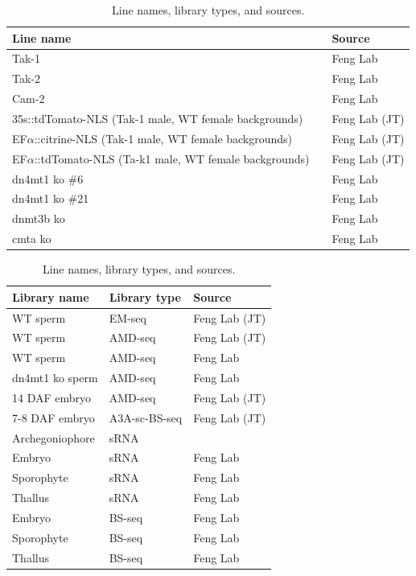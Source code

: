 \begin{table}[htbp]
\centering
\begin{tabular}{|p{6cm}|p{3cm}|p{4cm}|} %
\hline
\textbf{Line name} &  & \textbf{Source} \\
\hline
Tak-1 & & Feng Lab \\
Tak-2 & & Feng Lab \\
Cam-2 & & Feng Lab \\
35s::tdTomato-NLS (Tak-1 male, WT female backgrounds) & & Feng Lab (JT) \\
EF$\alpha$::citrine-NLS (Tak-1 male, WT female backgrounds) & & Feng Lab (JT) \\
EF$\alpha$::tdTomato-NLS (Ta-k1 male, WT female backgrounds) & & Feng Lab (JT) \\
dn4mt1 ko \#6 & & Feng Lab \citep{RN189} \\
dn4mt1 ko \#21 & & Feng Lab \citep{RN189} \\
dnmt3b ko & & Feng Lab \citep{RN189} \\
cmta ko & & Feng Lab \citep{RN189} \\
\hline
\end{tabular}
\begin{tabular}{|p{6cm}|p{3cm}|p{4cm}|} %
\hline
\textbf{Library name} & \textbf{Library type} & \textbf{Source} \\
\hline
WT sperm & EM-seq & Feng Lab (JT) \\
WT sperm & AMD-seq & Feng Lab (JT) \\
WT sperm & AMD-seq & Feng Lab \\
dn4mt1 ko sperm & AMD-seq & Feng Lab \\
14 DAF embryo & AMD-seq & Feng Lab (JT) \\
7-8 DAF embryo & A3A-sc-BS-seq & Feng Lab (JT) \\
\hline
Archegoniophore & sRNA & \citep{RN308} \\
Embryo & sRNA & Feng Lab \\
Sporophyte & sRNA & Feng Lab \\
Thallus & sRNA & Feng Lab \\
\hline
Embryo & BS-seq & Feng Lab \\
Sporophyte & BS-seq & Feng Lab \\
Thallus & BS-seq & Feng Lab \\
\hline
\end{tabular}
\caption{Line names, library types, and sources.}
\label{ch3:workbyothers}
\end{table}


